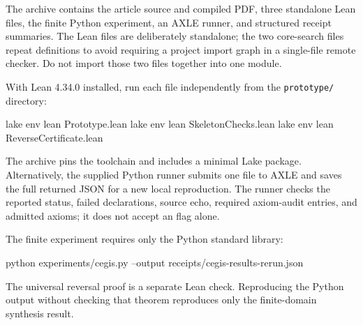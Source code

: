 \documentclass[11pt,letterpaper]{article}
\newcommand{\id}[1]{\texttt{\detokenize{#1}}}
\newcommand{\pathref}[1]{\nolinkurl{#1}}
\theoremstyle{definition}
\theoremstyle{remark}
\begin{document}
The archive contains the article source and compiled PDF, three standalone Lean files, the finite Python experiment, an AXLE runner, and structured receipt summaries. The Lean files are deliberately standalone; the two core-search files repeat definitions to avoid requiring a project import graph in a single-file remote checker. Do not import those two files together into one module.

With Lean 4.34.0 installed, run each file independently from the \pathref{prototype/} directory:
\begin{code}
lake env lean Prototype.lean
lake env lean SkeletonChecks.lean
lake env lean ReverseCertificate.lean
\end{code}
The archive pins the toolchain and includes a minimal Lake package. Alternatively, the supplied Python runner submits one file to AXLE and saves the full returned JSON for a new local reproduction. The runner checks the reported status, failed declarations, source echo, required axiom-audit entries, and admitted axioms; it does not accept an \id{okay} flag alone.

The finite experiment requires only the Python standard library:
\begin{code}
python experiments/cegis.py --output receipts/cegis-results-rerun.json
\end{code}
The universal reversal proof is a separate Lean check. Reproducing the Python output without checking that theorem reproduces only the finite-domain synthesis result.
\end{document}
